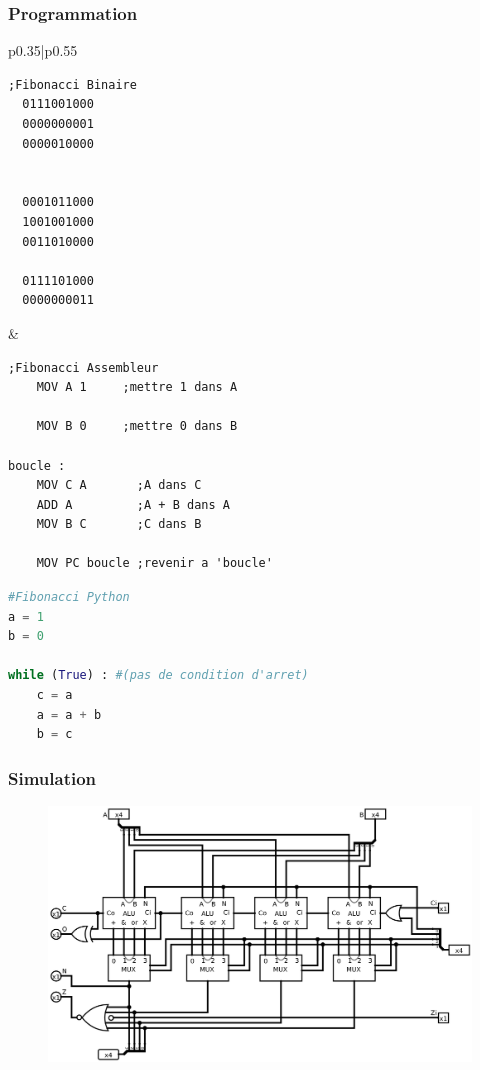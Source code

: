 \begin{frame}[fragile]

  \frametitle{Programmation}

\begin{tabular}{p{0.35\textwidth}|p{0.55\textwidth}}
\begin{minipage}[t]{\linewidth}
  \begin{lstlisting}[]
;Fibonacci Binaire
  0111001000
  0000000001
  0000010000


  0001011000
  1001001000
  0011010000

  0111101000
  0000000011
  \end{lstlisting}

\end{minipage}&\begin{minipage}[t]{\linewidth}
  \begin{lstlisting}[]
;Fibonacci Assembleur
	MOV A 1 	;mettre 1 dans A

	MOV B 0		;mettre 0 dans B

boucle :
	MOV C A   	  ;A dans C
	ADD A      	  ;A + B dans A
	MOV B C   	  ;C dans B

	MOV PC boucle ;revenir a 'boucle'
  \end{lstlisting}
\end{minipage}
\end{tabular}

  \begin{lstlisting}[language=Python]
#Fibonacci Python
a = 1
b = 0

while (True) : #(pas de condition d'arret)
	c = a
	a = a + b
	b = c
  \end{lstlisting}



\end{frame}




\begin{frame}

  \frametitle{Simulation}


  \begin{figure}

    \centering
    \includegraphics[width=\linewidth]{pics/test.png}

  \end{figure}


\end{frame}
